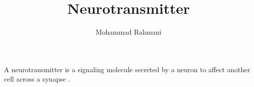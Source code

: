 \documentclass[a4paper]{article}
\title{Neurotransmitter}
\date{}
\author{Mohammad Rahmani}
\begin{document}
\maketitle
    A neurotransmitter is a signaling molecule secreted by a neuron to affect another cell across a synapse .
    
    
\end{document}
